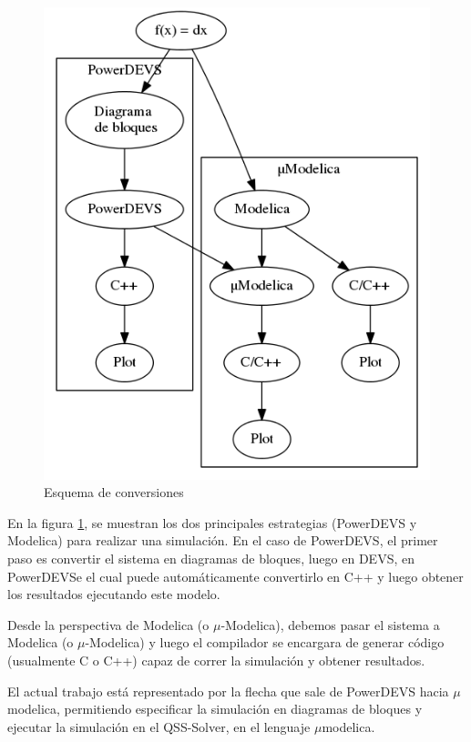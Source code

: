 \begin{figure}[H]
\centering
 \includegraphics[width=0.75\linewidth]{esquema}
 \caption{Esquema de conversiones}
 \label{fig:esquema}
\end{figure}

En la figura \ref{fig:esquema}, se muestran los dos principales estrategias (PowerDEVS y Modelica) para realizar una simulación. En el caso de PowerDEVS, el primer paso es convertir el sistema en diagramas de bloques, luego en DEVS, en PowerDEVSe el cual puede automáticamente convertirlo en C++ y luego obtener los resultados ejecutando este modelo. 

Desde la perspectiva de Modelica (o $\mu$-Modelica), debemos pasar el sistema a Modelica (o $\mu$-Modelica) y luego el compilador se encargara de generar código (usualmente C o C++) capaz de correr la simulación y obtener resultados.

El actual trabajo está representado por la flecha que sale de PowerDEVS hacia $\mu$modelica, permitiendo especificar la simulación en diagramas de bloques y ejecutar la simulación en el QSS-Solver, en el lenguaje $\mu$modelica.


